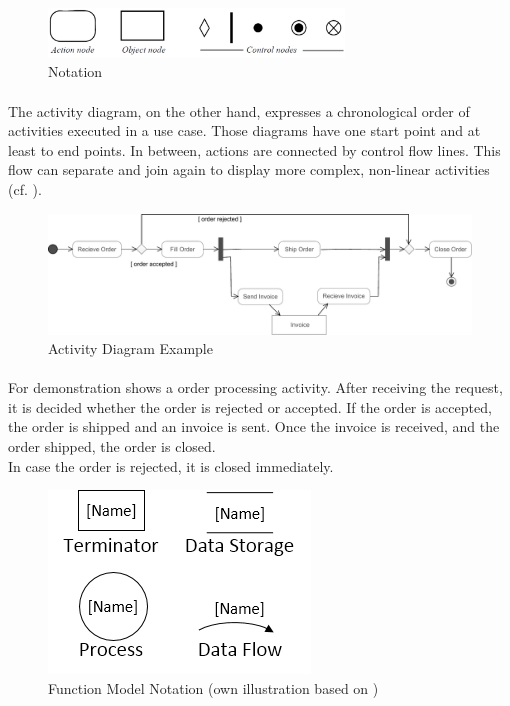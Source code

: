 \begin{figure}[H]
    \centering
    \includegraphics[width=0.7\textwidth]{img/ActivitySymbols.pdf}
    \caption{Notation}\label{fig:adSymb}
\end{figure}

\paragraph{} The activity diagram, on the other hand, expresses a chronological order of activities executed in a use case. Those diagrams have one start point and at least to end points. In between, actions are connected by control flow lines. This flow can separate and join again to display more complex, non-linear activities  (cf. ).

\begin{figure}[H]
    \centering
    \includegraphics[width=\textwidth]{img/ActivityExample.pdf}
    \caption{Activity Diagram Example \parencite[380]{ObjectManagementGroup.01.03.2015}}\label{fig:adEx}
\end{figure}

\paragraph{} For demonstration  shows a order processing activity. After receiving the request, it is decided whether the order is rejected or accepted. If the order is accepted, the order is shipped and an invoice is sent. Once the invoice is received, and the order shipped, the order is closed. \\
In case the order is rejected, it is closed immediately. 

\begin{figure}[H]
    \centering
    \includegraphics[scale=0.9]{img/fmSymb.png}
    \caption[Function Model Notation]{Function Model Notation (own illustration based on \cite[190]{Pohl.2007})}
    \label{fig:fmSymb}
\end{figure}



